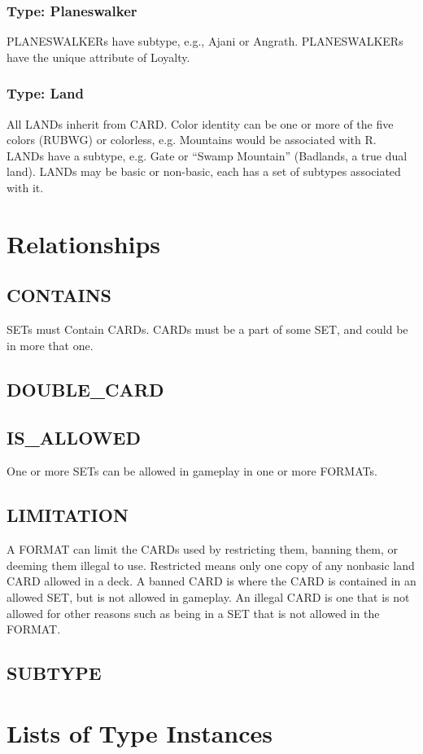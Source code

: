 \documentclass{article}
\begin{document}
\subsubsection{Type: Planeswalker}
PLANESWALKERs have subtype, e.g., Ajani or Angrath.
PLANESWALKERs have the unique attribute of Loyalty.
\subsubsection{Type: Land}
All LANDs inherit from CARD.
Color identity can be one or more of the five colors (RUBWG) or colorless, e.g.  Mountains would be associated with R.
LANDs have a subtype, e.g. Gate or “Swamp Mountain” (Badlands, a true dual land).
LANDs may be basic or non-basic, each has a set of subtypes associated with it.
\section{Relationships}
\subsection{CONTAINS}
SETs must Contain CARDs.
CARDs must be a part of some SET, and could be in more that one.
\subsection{DOUBLE\_CARD}
\subsection{IS\_ALLOWED}
One or more SETs can be allowed in gameplay in one or more FORMATs.
\subsection{LIMITATION}
A FORMAT can limit the CARDs used by restricting them, banning them, or deeming them illegal to use.
Restricted means only one copy of any nonbasic land CARD allowed in a deck.
A banned CARD is where the CARD is contained in an allowed SET, but is not allowed in gameplay.
An illegal CARD is one that is not allowed for other reasons such as being in a SET that is not allowed in the FORMAT.
\subsection{SUBTYPE}
\section{Lists of Type Instances}
\end{document}
